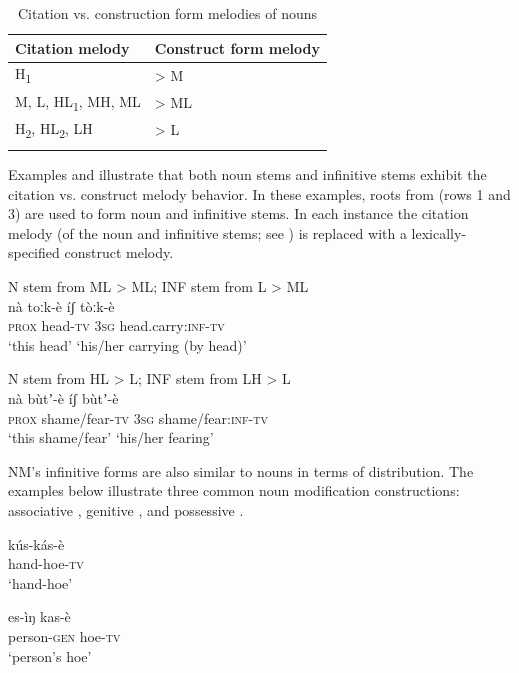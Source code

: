 \documentclass[output=paper]{langsci/langscibook}
\begin{document}
\begin{table}
\caption{Citation vs. construction form melodies of nouns}
\label{tab:mahland:4}

\begin{tabular}{ll} 
\lsptoprule

  Citation melody &   Construct form melody\\
\midrule
H\textsubscript{1} & {>} M\\
M, L, HL\textsubscript{1}, MH, ML & {>} ML\\
H\textsubscript{2}, HL\textsubscript{2}, LH & {>} L\\
\lspbottomrule
\end{tabular}
\end{table}

Examples  and  illustrate that both noun stems and infinitive stems exhibit the citation vs. construct melody behavior. In these examples, roots from  (rows 1 and 3) are used to form noun and infinitive stems. In each instance the citation melody (of the noun and infinitive stems; see ) is replaced with a lexically-specified construct melody.  


\ea\label{ex:mahland:24}
N stem from ML > ML; INF stem from L > ML\\
\gll nà      toːk-è    íʃ      tòːk-è\\
\textsc{prox}   head\textsc{{}-tv}  \textsc{3sg}    head.carry\textsc{:inf-tv}\\
\glt `this head'    `his/her carrying (by head)'
\z

\ea\label{ex:mahland:25}
N stem from HL > L; INF stem from LH > L\\
\gll nà       bùtʼ-è      íʃ        bùtʼ-è\\
\textsc{prox}   shame/fear\textsc{{}-tv}   \textsc{3sg}     shame/fear:\textsc{inf-tv} \\
\glt `this shame/fear'    `his/her fearing'
\z

NM's infinitive forms are also similar to nouns in terms of distribution. The examples below illustrate three common noun modification constructions: associative , genitive , and possessive .

\ea\label{ex:mahland:26}
\gll kús-kás-è  \\
hand-hoe\textsc{{}-tv}\\
\glt `hand-hoe'
\z

\ea\label{ex:mahland:27}
\gll es-ìŋ            kas-è   \\
person\textsc{{}-gen}   hoe\textsc{{}-tv}\\
\glt `person's hoe'
\z
\end{document}
